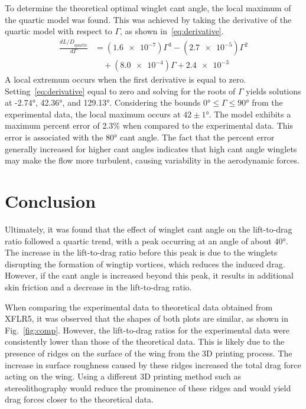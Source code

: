 \documentclass[journal,letterpaper]{IEEEtran}
\begin{document}
To determine the theoretical optimal winglet cant angle, the local maximum of the quartic model was found.
This was achieved by taking the derivative of the quartic model with respect to $\Gamma$, as shown in~\eqref{eq:derivative}.
\begin{equation} \label{eq:derivative}
    \begin{split}
        \frac{d{L/D}_\text{quartic}}{d\Gamma} &= (\num{1.6e-7})\Gamma^3 - (\num{2.7e-5})\Gamma^2 \\
        &\quad + (\num{8.0e-4})\Gamma + \num{2.4e-3}
    \end{split}
\end{equation}
A local extremum occurs when the first derivative is equal to zero.
Setting~\eqref{eq:derivative} equal to zero and solving for the roots of $\Gamma$ yields solutions at \ang{-2.74}, \ang{42.36}, and \ang{129.13}.
Considering the bounds $\ang{0} \leq \Gamma \leq \ang{90}$ from the experimental data, the local maximum occurs at $42 \pm \ang{1}$.
The model exhibits a maximum percent error of 2.3\% when compared to the experimental data.
This error is associated with the \ang{80} cant angle.
The fact that the percent error generally increased for higher cant angles indicates that high cant angle winglets may make the flow more turbulent, causing variability in the aerodynamic forces.


\section{Conclusion}


Ultimately, it was found that the effect of winglet cant angle on the lift-to-drag ratio followed a quartic trend, with a peak occurring at an angle of about \ang{40}.
The increase in the lift-to-drag ratio before this peak is due to the winglets disrupting the formation of wingtip vortices, which reduces the induced drag.
However, if the cant angle is increased beyond this peak, it results in additional skin friction and a decrease in the lift-to-drag ratio.

When comparing the experimental data to theoretical data obtained from XFLR5, it was observed that the shapes of both plots are similar, as shown in Fig.~\ref{fig:comp}.
However, the lift-to-drag ratios for the experimental data were consistently lower than those of the theoretical data.
This is likely due to the presence of ridges on the surface of the wing from the 3D printing process.
The increase in surface roughness caused by these ridges increased the total drag force acting on the wing.
Using a different 3D printing method such as stereolithography would reduce the prominence of these ridges and would yield drag forces closer to the theoretical data.
\end{document}
